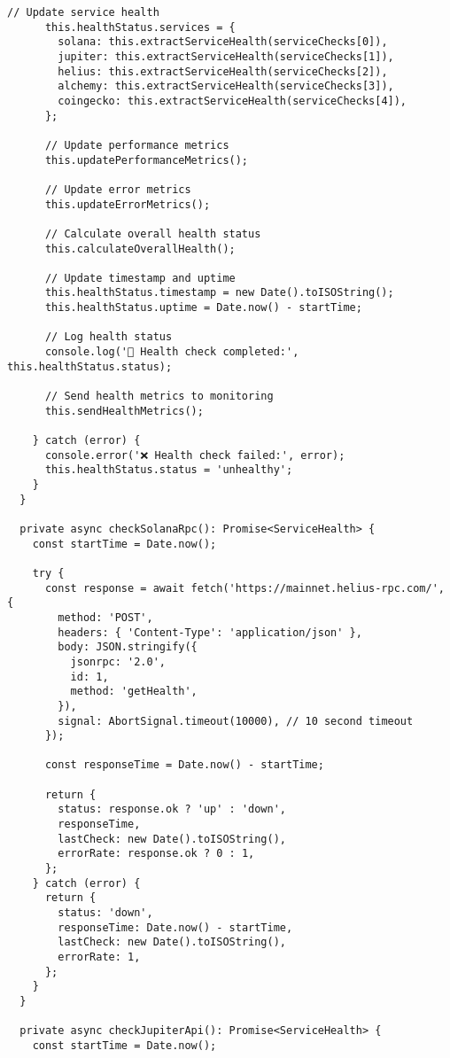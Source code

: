 \documentclass[11pt,a4paper]{article}
\begin{document}
\begin{lstlisting}[style=javascript, caption=Comprehensive Health Monitoring System]
      // Update service health
      this.healthStatus.services = {
        solana: this.extractServiceHealth(serviceChecks[0]),
        jupiter: this.extractServiceHealth(serviceChecks[1]),
        helius: this.extractServiceHealth(serviceChecks[2]),
        alchemy: this.extractServiceHealth(serviceChecks[3]),
        coingecko: this.extractServiceHealth(serviceChecks[4]),
      };
      
      // Update performance metrics
      this.updatePerformanceMetrics();
      
      // Update error metrics
      this.updateErrorMetrics();
      
      // Calculate overall health status
      this.calculateOverallHealth();
      
      // Update timestamp and uptime
      this.healthStatus.timestamp = new Date().toISOString();
      this.healthStatus.uptime = Date.now() - startTime;
      
      // Log health status
      console.log('🏥 Health check completed:', this.healthStatus.status);
      
      // Send health metrics to monitoring
      this.sendHealthMetrics();
      
    } catch (error) {
      console.error('❌ Health check failed:', error);
      this.healthStatus.status = 'unhealthy';
    }
  }
  
  private async checkSolanaRpc(): Promise<ServiceHealth> {
    const startTime = Date.now();
    
    try {
      const response = await fetch('https://mainnet.helius-rpc.com/', {
        method: 'POST',
        headers: { 'Content-Type': 'application/json' },
        body: JSON.stringify({
          jsonrpc: '2.0',
          id: 1,
          method: 'getHealth',
        }),
        signal: AbortSignal.timeout(10000), // 10 second timeout
      });
      
      const responseTime = Date.now() - startTime;
      
      return {
        status: response.ok ? 'up' : 'down',
        responseTime,
        lastCheck: new Date().toISOString(),
        errorRate: response.ok ? 0 : 1,
      };
    } catch (error) {
      return {
        status: 'down',
        responseTime: Date.now() - startTime,
        lastCheck: new Date().toISOString(),
        errorRate: 1,
      };
    }
  }
  
  private async checkJupiterApi(): Promise<ServiceHealth> {
    const startTime = Date.now();
    

\end{lstlisting}
\end{document}
